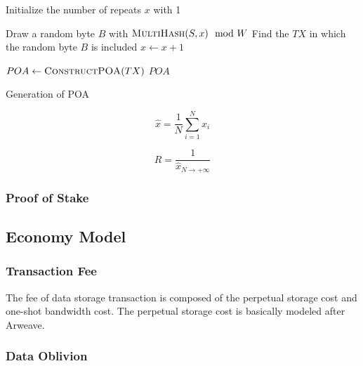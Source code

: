 \documentclass[]{article}
\newcounter{subsubsubsection}[subsubsection]
\begin{document}
\IncMargin{1em}
\begin{algorithm}

    \SetAlgoNoLine

    \BlankLine

    Initialize the number of repeats $x$ with 1\;
    \BlankLine

    \Repeat
        {}
        {
        Draw a random byte $B$ with $\Call{MultiHash}{S, x} \mod W$\;
        Find the $TX$ in which the random byte $B$ is included\;
        {$x \leftarrow x + 1$}\;
    }

    \BlankLine
    $POA \leftarrow \Call{ConstructPOA}{TX}$\;
    \Return $POA$\;
    \caption{Generation of POA}
\end{algorithm}
\DecMargin{1em}

$$
\hat{x} = \frac{1}{N} {\sum_{i=1}^N x_i}
$$

$$
R = \frac{1}{\hat{x}_{{N \to +\infty}}}
$$

\subsubsection{Proof of Stake}



\subsection{Economy Model}

\subsubsection{Transaction Fee}

The fee of data storage transaction is composed of the perpetual storage cost and one-shot bandwidth cost. The perpetual storage cost is basically modeled after Arweave.

\subsubsection{Data Oblivion}
\end{document}
